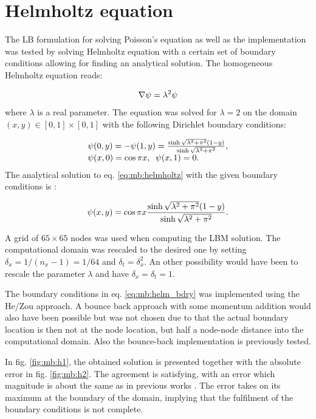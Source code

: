\section{Helmholtz equation}
The LB formulation for solving Poisson's equation as well as the
implementation was tested by solving Helmholtz equation with a
certain set of boundary conditions allowing for finding an analytical
solution. The homogeneous Helmholtz equation reads:

\begin{equation}\label{eq:mb:helmholtz}
\nabla \mathrm{\psi} = \lambda^2 \mathrm{\psi}
\end{equation}
where $\lambda$ is a real parameter. The equation was solved for
$\lambda = 2$ on the domain $(x, y)\in[0, 1]\times[0, 1]$ with the
following Dirichlet boundary conditions:

\begin{equation}\label{eq:mb:helm_bdry}
  \begin{array}{l l}
\mathrm{\psi}(0, y) = -\mathrm{\psi}(1, y) = \frac{\sinh\sqrt{\lambda^2 + \pi^2}(1 -
  y)}{\sinh\sqrt{\lambda^2 + \pi^2}},\\ \mathrm{\psi}(x, 0) =
\cos\pi x,\;\; \mathrm{\psi}(x, 1) = 0.
\end{array}
\end{equation}
The analytical solution to eq. \eqref{eq:mb:helmholtz} with the given
boundary conditions is \cite{chai_poi}:

\begin{equation}
\mathrm{\psi}(x, y) = \cos\pi x \frac{\sinh\sqrt{\lambda^2 + \pi^2}(1 -
  y)}{\sinh\sqrt{\lambda^2 + \pi^2}}.
\end{equation}

A grid of $65\times65$ nodes was used when computing the LBM
solution. The computational domain was rescaled to the desired one by
setting $\delta_x = 1/(n_x-1) = 1/64$ and $\delta_t = \delta_x^2$. An
other possibility would have been to rescale the parameter $\lambda$
and have $\delta_x = \delta_t = 1$.

The boundary conditions in eq. \eqref{eq:mb:helm_bdry} was implemented
using the He/Zou approach. A bounce back approach with some momentum
addition would also have been possible but was not chosen due to that
the actual boundary location is then not at the node location, but
half a node-node distance into the computational domain. Also the
bounce-back implementation is previously tested.

In fig. \ref{fig:mb:h1}, the obtained solution is presented together
with the absolute error in fig. \ref{fig:mb:h2}. The agreement is
satisfying, with an error which magnitude is about the same as in
previous works \cite{chai_poi}. The error takes on its maximum at the
boundary of the domain, implying that the fulfilment of the boundary
conditions is not complete.

